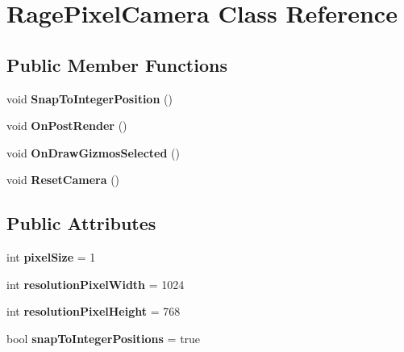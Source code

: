 \hypertarget{class_rage_pixel_camera}{\section{Rage\-Pixel\-Camera Class Reference}
\label{class_rage_pixel_camera}
}
\subsection*{Public Member Functions}
\begin{DoxyCompactItemize}
\item 
\hypertarget{class_rage_pixel_camera_a546631654240013c031169061b5f8315}{void {\bfseries Snap\-To\-Integer\-Position} ()}\label{class_rage_pixel_camera_a546631654240013c031169061b5f8315}

\item 
\hypertarget{class_rage_pixel_camera_afebda17b96f07b838a6530c8d5bde0dc}{void {\bfseries On\-Post\-Render} ()}\label{class_rage_pixel_camera_afebda17b96f07b838a6530c8d5bde0dc}

\item 
\hypertarget{class_rage_pixel_camera_a86a72a6ec06252c45ca05489b83099d9}{void {\bfseries On\-Draw\-Gizmos\-Selected} ()}\label{class_rage_pixel_camera_a86a72a6ec06252c45ca05489b83099d9}

\item 
\hypertarget{class_rage_pixel_camera_af05dd97ff4845ed6d3b0884b2828576c}{void {\bfseries Reset\-Camera} ()}\label{class_rage_pixel_camera_af05dd97ff4845ed6d3b0884b2828576c}

\end{DoxyCompactItemize}
\subsection*{Public Attributes}
\begin{DoxyCompactItemize}
\item 
\hypertarget{class_rage_pixel_camera_af8bd4b43ad183233d5bcd3fbdc229e7e}{int {\bfseries pixel\-Size} = 1}\label{class_rage_pixel_camera_af8bd4b43ad183233d5bcd3fbdc229e7e}

\item 
\hypertarget{class_rage_pixel_camera_ae493f3e0bbb5e9deaeecdd3f48e0c254}{int {\bfseries resolution\-Pixel\-Width} = 1024}\label{class_rage_pixel_camera_ae493f3e0bbb5e9deaeecdd3f48e0c254}

\item 
\hypertarget{class_rage_pixel_camera_a4d759820269512aa281ee37f2337b3ea}{int {\bfseries resolution\-Pixel\-Height} = 768}\label{class_rage_pixel_camera_a4d759820269512aa281ee37f2337b3ea}

\item 
\hypertarget{class_rage_pixel_camera_ac7a3562612020282d5b1ec87fb7ba855}{bool {\bfseries snap\-To\-Integer\-Positions} = true}\label{class_rage_pixel_camera_ac7a3562612020282d5b1ec87fb7ba855}

\end{DoxyCompactItemize}


